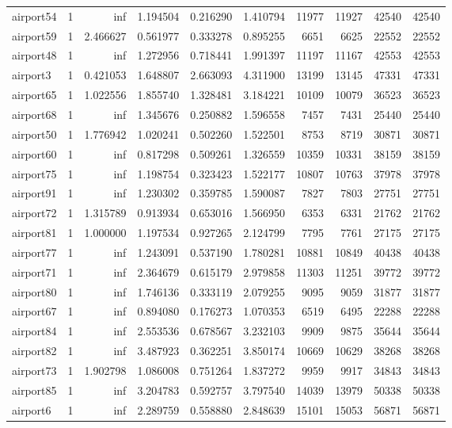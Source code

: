 \begin{longtable}{|l|r|r|r|r|r|r|r|r|r|}
airport54 & 1 & inf & 1.194504 & 0.216290 & 1.410794 & 11977 & 11927 & 42540 & 42540 \\
airport59 & 1 & 2.466627 & 0.561977 & 0.333278 & 0.895255 & 6651 & 6625 & 22552 & 22552 \\
airport48 & 1 & inf & 1.272956 & 0.718441 & 1.991397 & 11197 & 11167 & 42553 & 42553 \\
airport3 & 1 & 0.421053 & 1.648807 & 2.663093 & 4.311900 & 13199 & 13145 & 47331 & 47331 \\
airport65 & 1 & 1.022556 & 1.855740 & 1.328481 & 3.184221 & 10109 & 10079 & 36523 & 36523 \\
airport68 & 1 & inf & 1.345676 & 0.250882 & 1.596558 & 7457 & 7431 & 25440 & 25440 \\
airport50 & 1 & 1.776942 & 1.020241 & 0.502260 & 1.522501 & 8753 & 8719 & 30871 & 30871 \\
airport60 & 1 & inf & 0.817298 & 0.509261 & 1.326559 & 10359 & 10331 & 38159 & 38159 \\
airport75 & 1 & inf & 1.198754 & 0.323423 & 1.522177 & 10807 & 10763 & 37978 & 37978 \\
airport91 & 1 & inf & 1.230302 & 0.359785 & 1.590087 & 7827 & 7803 & 27751 & 27751 \\
airport72 & 1 & 1.315789 & 0.913934 & 0.653016 & 1.566950 & 6353 & 6331 & 21762 & 21762 \\
airport81 & 1 & 1.000000 & 1.197534 & 0.927265 & 2.124799 & 7795 & 7761 & 27175 & 27175 \\
airport77 & 1 & inf & 1.243091 & 0.537190 & 1.780281 & 10881 & 10849 & 40438 & 40438 \\
airport71 & 1 & inf & 2.364679 & 0.615179 & 2.979858 & 11303 & 11251 & 39772 & 39772 \\
airport80 & 1 & inf & 1.746136 & 0.333119 & 2.079255 & 9095 & 9059 & 31877 & 31877 \\
airport67 & 1 & inf & 0.894080 & 0.176273 & 1.070353 & 6519 & 6495 & 22288 & 22288 \\
airport84 & 1 & inf & 2.553536 & 0.678567 & 3.232103 & 9909 & 9875 & 35644 & 35644 \\
airport82 & 1 & inf & 3.487923 & 0.362251 & 3.850174 & 10669 & 10629 & 38268 & 38268 \\
airport73 & 1 & 1.902798 & 1.086008 & 0.751264 & 1.837272 & 9959 & 9917 & 34843 & 34843 \\
airport85 & 1 & inf & 3.204783 & 0.592757 & 3.797540 & 14039 & 13979 & 50338 & 50338 \\
airport6 & 1 & inf & 2.289759 & 0.558880 & 2.848639 & 15101 & 15053 & 56871 & 56871 \\

\end{longtable}
